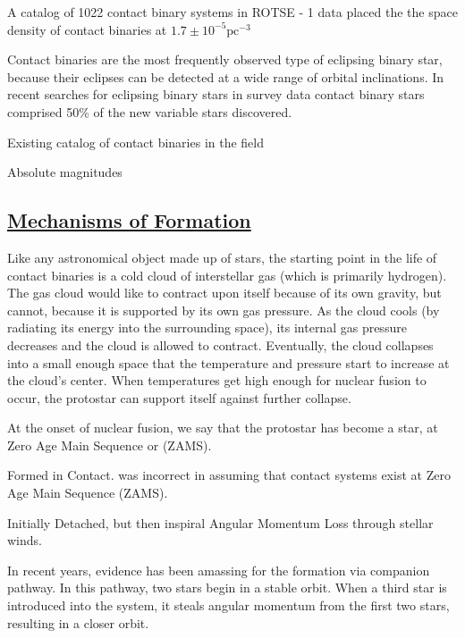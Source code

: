 \documentclass[12pt]{article} %
\numberwithin{equation}{section} %
\begin{document}
A catalog of 1022 contact binary systems in ROTSE - 1 data placed the the space density of contact binaries at $1.7 \pm 10^{-5} \text{pc}^{-3}$ \citep{gettel2006catalog}
 
Contact binaries are the most frequently observed type of eclipsing binary star, because their eclipses can be detected at a wide range of orbital inclinations. In recent searches for eclipsing binary stars in survey data \citep{drake2014catalina} contact binary stars comprised 50\% of the new variable stars discovered. 

Existing catalog of contact binaries in the field \citep{pribulla2003catalogue}

Absolute magnitudes \citep{rucinski1997absolute} 

\subsection[Mechanisms of Formation]{\hyperlink{toc}{Mechanisms of Formation}}

Like any astronomical object made up of stars, the starting point in the life of contact binaries is a cold cloud of interstellar gas (which is primarily hydrogen). The gas cloud would like to contract upon itself because of its own gravity, but cannot, because it is supported by its own gas pressure. As the cloud cools (by radiating its energy into the surrounding space), its internal gas pressure decreases and the cloud is allowed to contract. Eventually, the cloud collapses into a small enough space that the temperature and pressure start to increase at the cloud's center. When temperatures get high enough for nuclear fusion to occur, the protostar can support itself against further collapse. 

At the onset of nuclear fusion, we say that the protostar has become a star, at Zero Age Main Sequence or (ZAMS).  
 
Formed in Contact. \citet{lucy1968structure} was incorrect in assuming that contact systems exist at Zero Age Main Sequence (ZAMS).

\citep{yildiz2013origin}

\citep{bilir2005kinematics}

\citep{li2007formation}

Initially Detached, but then inspiral
Angular Momentum Loss through stellar winds. 

In recent years, evidence has been amassing for the formation via companion pathway. In this pathway, two stars begin in a stable orbit. When a third star is introduced into the system, it steals angular momentum from the first two stars, resulting in a closer orbit. 
\end{document}
